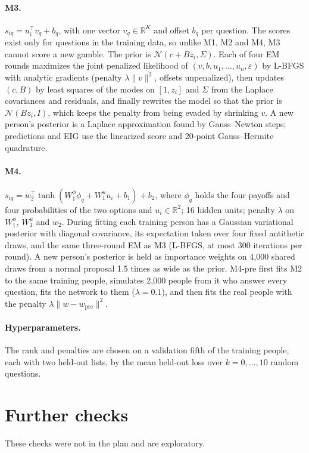 \documentclass{article}
\begin{document}
\paragraph{M3.} $s_{iq} = u_i^\top v_q + b_q$, with one vector $v_q \in \mathbb{R}^K$ and offset $b_q$ per question. The scores exist only for questions in the training data, so unlike M1, M2 and M4, M3 cannot score a new gamble. The prior is $\mathcal{N}(c + B z_i, \Sigma)$. Each of four EM rounds maximizes the joint penalized likelihood of $(v, b, u_1, \dots, u_n, \varepsilon)$ by L-BFGS with analytic gradients (penalty $\lambda\lVert v\rVert^2$, offsets unpenalized), then updates $(c, B)$ by least squares of the modes on $[1, z_i]$ and $\Sigma$ from the Laplace covariances and residuals, and finally rewrites the model so that the prior is $\mathcal{N}(B z_i, I)$, which keeps the penalty from being evaded by shrinking $v$. A new person's posterior is a Laplace approximation found by Gauss--Newton steps; predictions and EIG use the linearized score and 20-point Gauss--Hermite quadrature.

\paragraph{M4.} $s_{iq} = w_2^\top \tanh(W_1^{\phi}\phi_q + W_1^{u}u_i + b_1) + b_2$, where $\phi_q$ holds the four payoffs and four probabilities of the two options and $u_i \in \mathbb{R}^2$; 16 hidden units; penalty $\lambda$ on $W_1^{\phi}$, $W_1^{u}$ and $w_2$. During fitting each training person has a Gaussian variational posterior with diagonal covariance, its expectation taken over four fixed antithetic draws, and the same three-round EM as M3 (L-BFGS, at most 300 iterations per round). A new person's posterior is held as importance weights on 4,000 shared draws from a normal proposal 1.5 times as wide as the prior. M4-pre first fits M2 to the same training people, simulates 2,000 people from it who answer every question, fits the network to them ($\lambda = 0.1$), and then fits the real people with the penalty $\lambda\lVert w - w_{\mathrm{pre}}\rVert^2$.

\paragraph{Hyperparameters.} The rank and penalties are chosen on a validation fifth of the training people, each with two held-out lists, by the mean held-out loss over $k = 0, \dots, 10$ random questions.

\section{Further checks}\label{app:checks}
These checks were not in the plan and are exploratory.
\end{document}
